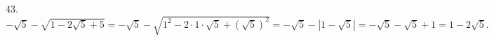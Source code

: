 43. $-\sqrt{5}-\sqrt{1-2\sqrt{5}+5}=-\sqrt{5}-\sqrt{1^2-2\cdot1\cdot\sqrt{5}+(\sqrt{5})^2}=-\sqrt{5}-|1-\sqrt{5}|=-\sqrt{5}-\sqrt{5}+1=1-2\sqrt{5}.$\\
